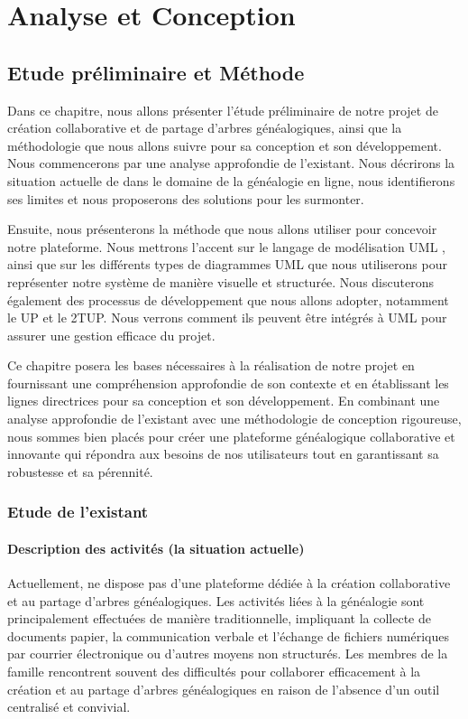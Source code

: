 \part{Analyse et Conception }
\chapter{Etude préliminaire et Méthode}

Dans ce chapitre, nous allons présenter l’étude préliminaire de notre projet de
création collaborative et de partage d’arbres généalogiques, ainsi que la
méthodologie que nous allons suivre pour sa conception et son développement.
Nous commencerons par une analyse approfondie de l’existant. Nous décrirons la
situation actuelle de \firm dans le domaine de la généalogie en ligne, nous
identifierons ses limites et nous proposerons des solutions pour les surmonter.

Ensuite, nous présenterons la méthode que nous allons utiliser pour concevoir notre
plateforme. Nous mettrons l’accent sur le langage de modélisation \ac{UML} ,
ainsi que sur les différents types de diagrammes UML que nous utiliserons pour
représenter notre système de manière visuelle et structurée. Nous discuterons
également des processus de développement que nous allons adopter, notamment
le \ac{UP} et le \ac{2TUP}. Nous verrons comment ils peuvent être intégrés
à UML pour assurer une gestion efficace du projet.

Ce chapitre posera les bases nécessaires à la réalisation de notre projet en
fournissant une compréhension approfondie de son contexte et en établissant
les lignes directrices pour sa conception et son développement. En combinant
une analyse approfondie de l’existant avec une méthodologie de conception
rigoureuse, nous sommes bien placés pour créer une plateforme généalogique
collaborative et innovante qui répondra aux besoins de nos utilisateurs tout
en garantissant sa robustesse et sa pérennité.

\section{Etude de l'existant}
\subsection{Description des activités (la situation actuelle)}
Actuellement, \firm ne dispose pas d’une plateforme dédiée à la création
collaborative et au partage d’arbres généalogiques. Les activités liées à la
généalogie sont principalement effectuées de manière traditionnelle, impliquant
la collecte de documents papier, la communication verbale et l’échange de fichiers
numériques par courrier électronique ou d’autres moyens non structurés. Les
membres de la famille rencontrent souvent des difficultés pour collaborer
efficacement à la création et au partage d'arbres généalogiques en raison de
l'absence d'un outil centralisé et convivial.

